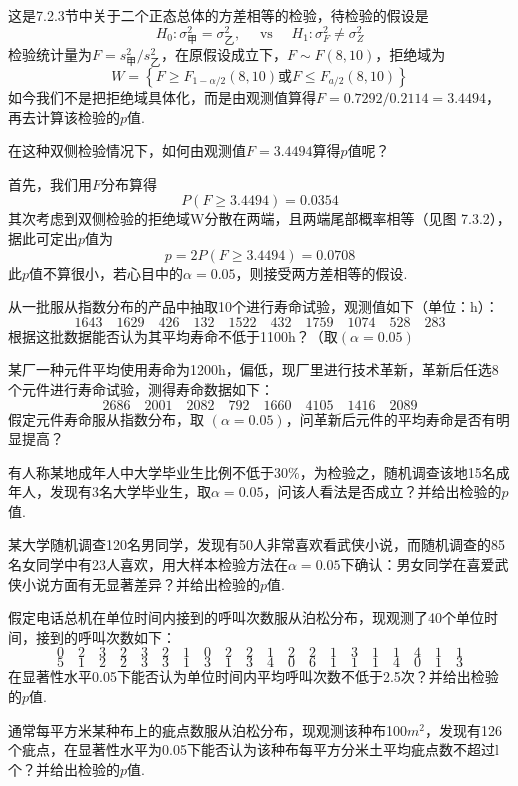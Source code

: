 \begin{solution}
这是7.2.3节中关于二个正态总体的方差相等的检验，待检验的假设是
\[H _ { 0 } : \sigma _ { \text{甲} } ^ { 2 } = \sigma _ { \text{乙} } ^ { 2 } , \quad \text { vs } \quad H _ { 1 } : \sigma _ { F } ^ { 2 } \neq \sigma _ { Z } ^ { 2 }\]
检验统计量为$F = s _ { \text{甲}  } ^ { 2 } / s _ { \text{乙}  } ^ { 2 }$，在原假设成立下，$F \sim F ( 8,10 )$，拒绝域为
\[
W=\left\{F\geq F_{1-\alpha/2}\left(8,10\right)\textrm{或}F\leq F_{a/2}\left(8,10\right)\right\}
\]
如今我们不是把拒绝域具体化，而是由观测值算得$F=0.7292/0.2114=
3.4494$，再去计算该检验的$p$值.

在这种双侧检验情况下，如何由观测值$F=3.4494$算得$p$值呢？

首先，我们用$F$分布算得
\[P ( F \geq 3.4494 ) = 0.0354\]
其次考虑到双侧检验的拒绝域W分散在两端，且两端尾部概率相等（见图
7.3.2），据此可定出$p$值为
\[p = 2 P ( F \geq 3.4494 ) = 0.0708\]
此$p$值不算很小，若心目中的$\alpha=0.05$，则接受两方差相等的假设.
\end{solution}
\begin{xiti}
	\item 从一批服从指数分布的产品中抽取10个进行寿命试验，观测值如下（单位：h）：
	\[1643 \quad 1629 \quad 426 \quad 132 \quad 1522 \quad 432 \quad 1759 \quad 1074 \quad 528 \quad 283\]
	根据这批数据能否认为其平均寿命不低于1100h？（取$(\alpha=0.05)$
		
	\item 某厂一种元件平均使用寿命为1200h，偏低，现厂里进行技术革新，革新后任选8个元件进行寿命试验，测得寿命数据如下：
	\[2686 \quad 2001 \quad 2082 \quad 792 \quad 1660 \quad 4105 \quad 1416 \quad 2089\]
	假定元件寿命服从指数分布，取 $(\alpha=0.05)$，问革新后元件的平均寿命是否有明显提高？
	
	\item 有人称某地成年人中大学毕业生比例不低于30\%，为检验之，随机调查该地15名成年人，发现有3名大学毕业生，取$\alpha=0.05$，问该人看法是否成立？并给出检验的$p$值.
		
	\item 某大学随机调查120名男同学，发现有50人非常喜欢看武侠小说，而随机调查的85名女同学中有23人喜欢，用大样本检验方法在$\alpha=0.05$下确认：男女同学在喜爱武侠小说方面有无显著差异？并给出检验的$p$值.
	
			
	\item 假定电话总机在单位时间内接到的呼叫次数服从泊松分布，现观测了40个单位时间，接到的呼叫次数如下：
	\[0 \quad 2 \quad 3 \quad 2 \quad 3 \quad 2 \quad 1 \quad 0 \quad 2 \quad 2 \quad 1 \quad 2 \quad 2 \quad 1 \quad 3 \quad 1 \quad 1 \quad 4 \quad 1 \quad 1\]
	\[5 \quad 1 \quad 2 \quad 2 \quad 3 \quad 3 \quad 1 \quad 3 \quad 1 \quad 3 \quad 4 \quad 0 \quad 6 \quad 1 \quad 1 \quad 1 \quad 4 \quad 0 \quad 1 \quad 3\]
	在显著性水平0.05下能否认为单位时间内平均呼叫次数不低于2.5次？并给出检验的$p$值.
				
	\item 通常每平方米某种布上的疵点数服从泊松分布，现观测该种布100$m^{2}$，发现有126个疵点，在显著性水平为0.05下能否认为该种布每平方分米土平均疵点数不超过l个？并给出检验的$p$值.
\end{xiti}
